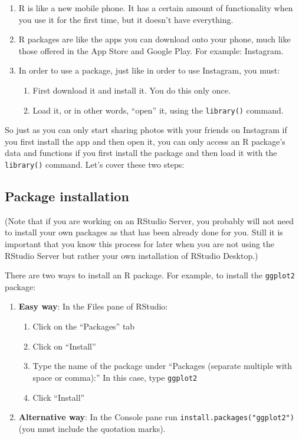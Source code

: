 \documentclass[12pt,]{krantz}
\providecommand{\tightlist}{%
  \setlength{\itemsep}{0pt}\setlength{\parskip}{0pt}}
\begin{document}
\begin{enumerate}
\def\labelenumi{\arabic{enumi}.}
\tightlist
\item
  R is like a new mobile phone. It has a certain amount of functionality
  when you use it for the first time, but it doesn't have everything.
\item
  R packages are like the apps you can download onto your phone, much
  like those offered in the App Store and Google Play. For example:
  Instagram.
\item
  In order to use a package, just like in order to use Instagram, you
  must:

  \begin{enumerate}
  \def\labelenumii{\arabic{enumii}.}
  \tightlist
  \item
    First download it and install it. You do this only once.
  \item
    Load it, or in other words, ``open'' it, using the
    \texttt{library()} command.
  \end{enumerate}
\end{enumerate}

So just as you can only start sharing photos with your friends on
Instagram if you first install the app and then open it, you can only
access an R package's data and functions if you first install the
package and then load it with the \texttt{library()} command. Let's
cover these two steps:

\subsection{Package installation}\label{package-installation}

(Note that if you are working on an RStudio Server, you probably will
not need to install your own packages as that has been already done for
you. Still it is important that you know this process for later when you
are not using the RStudio Server but rather your own installation of
RStudio Desktop.)

There are two ways to install an R package. For example, to install the
\texttt{ggplot2} package:

\begin{enumerate}
\def\labelenumi{\arabic{enumi}.}
\tightlist
\item
  \textbf{Easy way}: In the Files pane of RStudio:

  \begin{enumerate}
  \def\labelenumii{\alph{enumii})}
  \tightlist
  \item
    Click on the ``Packages'' tab
  \item
    Click on ``Install''
  \item
    Type the name of the package under ``Packages (separate multiple
    with space or comma):'' In this case, type \texttt{ggplot2}
  \item
    Click ``Install''
  \end{enumerate}
\item
  \textbf{Alternative way}: In the Console pane run
  \texttt{install.packages("ggplot2")} (you must include the quotation
  marks).
\end{enumerate}
\end{document}
